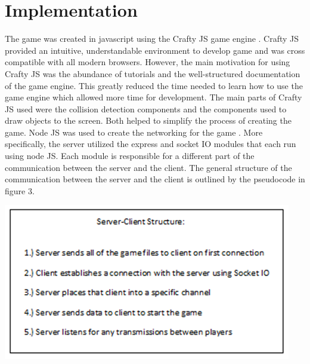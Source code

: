 \section{Implementation}


The game was created in javascript using the Crafty JS game engine \cite{craftyJS}. Crafty JS provided an intuitive, understandable environment to develop game and was cross compatible with all modern browsers. However, the main motivation for using Crafty JS was the abundance of tutorials and the well-structured documentation of the game engine. This greatly reduced the time needed to learn how to use the game engine which allowed more time for development.  The main parts of Crafty JS used were the collision detection components and the components used to draw objects to the screen. Both helped to simplify the process of creating the game.
Node JS was used to create the networking for the game \cite{nodeJS}. More specifically, the server utilized the express and socket IO modules that each run using node JS. Each module is responsible for a different part of the communication between the server and the client. The general structure of the communication between the server and the client is outlined by the pseudocode in figure 3. 

\includegraphics[scale = 0.75]{server.png}

